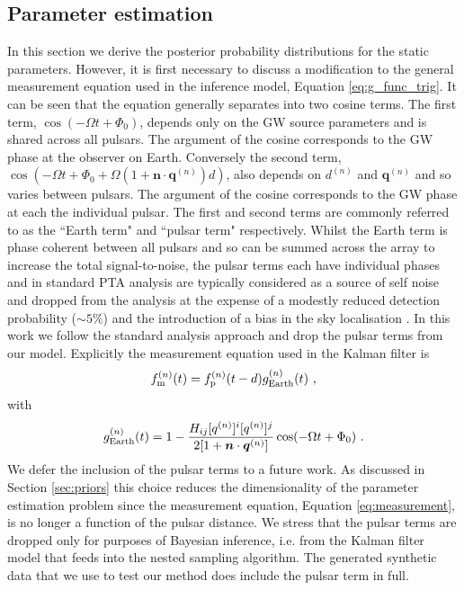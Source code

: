 \documentclass[fleqn,usenatbib,useAMS]{mnras}
\begin{document}
\subsection{Parameter estimation}\label{sec:parameter_estim}
In this section we derive the posterior probability distributions for the static parameters. However, it is first necessary to discuss a modification to the general measurement equation used in the inference model, Equation \eqref{eq:g_func_trig}. It can be seen that the equation generally separates into two cosine terms. The first term, $\cos(-\Omega t + \Phi_0)$, depends only on the GW source parameters and is shared across all pulsars. The argument of the cosine corresponds to the GW phase at the observer on Earth.  Conversely the second term, $\cos \left(-\Omega t +\Phi_0 + \Omega \left(1 + \boldsymbol{n}\cdot \boldsymbol{q}^{(n)} \right)  d \right)$, also depends on $d^{(n)}$ and $\boldsymbol{q}^{(n)}$ and so varies between pulsars. The argument of the cosine corresponds to the GW phase at each the individual pulsar. The first and second terms are commonly referred to as the ``Earth term" and ``pulsar term" respectively. Whilst the Earth term is phase coherent between all pulsars and so can be summed across the array to increase the total signal-to-noise, the pulsar terms each have individual phases and in standard PTA analysis are typically considered as a source of self noise and dropped from the analysis \citep[e.g.][]{Sesana2010,Babak2012,Petiteau2013,Zhu2015,Taylors2016,Goldstein2018,Charisi2023arXiv230403786C} at the expense of a modestly reduced detection probability ($\sim 5 \%$) and the introduction of a bias in the sky localisation \citep{Zhupulsarterms,Chen2022}. In this work we follow the standard analysis approach and drop the pulsar terms from our model. Explicitly the measurement equation used in the Kalman filter is
\begin{equation}
		f_{\rm m}^{(n)}(t) = f_{\rm p}^{(n)}(t-d) g^{(n)}_{\rm Earth}(t) \ , 
		\label{eq:measuremen_earth}
	\end{equation}
	with
	\begin{equation}
		g^{(n)}_{\rm Earth}(t) = 1 - \frac{ H_{ij}[q^{(n)}]^i [q^{(n)}]^j}{2[1 + \boldsymbol{n}\cdot \boldsymbol{q}^{(n)}] }  \cos(-\Omega t +\Phi_0)  \ .
		\label{eq:g_func_trig_earth}
	\end{equation}
	We defer the inclusion of the pulsar terms to a future work. As discussed in Section \ref{sec:priors} this choice reduces the dimensionality of the parameter estimation problem since the measurement equation, Equation \eqref{eq:measurement}, is no longer a function of the pulsar distance.  We stress that the pulsar terms are dropped only for purposes of Bayesian inference, i.e. from the Kalman filter model that feeds into the nested sampling algorithm. The generated synthetic data that we use to test our method does include the pulsar term in full. \newline 
	
\end{document}
